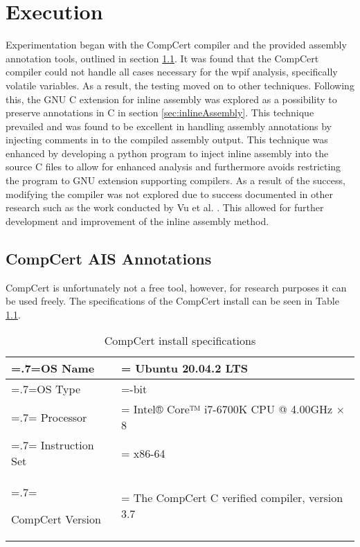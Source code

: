 \chapter{Execution}
Experimentation began with the CompCert compiler and the provided assembly annotation tools, outlined in section \ref{sec:compCert}. It was found that the CompCert compiler could not handle all cases necessary for the wpif analysis, specifically volatile variables. As a result, the testing moved on to other techniques. Following this, the GNU C extension for inline assembly was explored as a possibility to preserve annotations in C in section \ref{sec:inlineAssembly}. This technique prevailed and was found to be excellent in handling assembly annotations by injecting comments in to the compiled assembly output. This technique was enhanced by developing a python program to inject inline assembly into the source C files to allow for enhanced analysis and furthermore avoids restricting the program to GNU extension supporting compilers. As a result of the success, modifying the compiler was not explored due to success documented in other research such as the work conducted by Vu et al. \cite{vu2020secure}. This allowed for further development and improvement of the inline assembly method.

\section{CompCert AIS Annotations}
\label{sec:compCert}
CompCert is unfortunately not a free tool, however, for research purposes it can be used freely. The specifications of the CompCert install can be seen in Table \ref{tab:compcertInstall}. 

\begin{table}
    \begin{center}
        \begin{tabularx}{\linewidth} { 
            | >{\hsize=.7\hsize\linewidth=\hsize}X 
            | >{\hsize=1.3\hsize\linewidth=\hsize}X  | }
            \hline
            OS Name & Ubuntu 20.04.2 LTS \\
            \hline
            OS Type & 64-bit \\
            \hline
            Processor & Intel® Core™ i7-6700K CPU @ 4.00GHz × 8 \\
            \hline
            Instruction Set & x86-64 \\
            \hline
            \raggedright
            CompCert Version & The CompCert C verified compiler, version 3.7 \\
            \hline
        \end{tabularx}
    \end{center}
    \caption{CompCert install specifications}
    \label{tab:compcertInstall}
\end{table}

